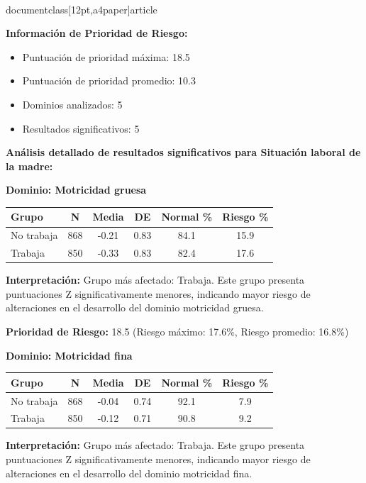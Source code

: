 \\documentclass[12pt,a4paper]{article}
\begin{document}
\textbf{Información de Prioridad de Riesgo:}
\begin{itemize}
\item Puntuación de prioridad máxima: 18.5
\item Puntuación de prioridad promedio: 10.3
\item Dominios analizados: 5
\item Resultados significativos: 5
\end{itemize}


\textbf{Análisis detallado de resultados significativos para Situación laboral de la madre:}


\textbf{Dominio: Motricidad gruesa}


\begin{center}
\begin{tabular}{|l|c|c|c|c|c|}
\hline
\textbf{Grupo} & \textbf{N} & \textbf{Media} & \textbf{DE} & \textbf{Normal \%} & \textbf{Riesgo \%} \\
\hline
No trabaja & 868 & -0.21 & 0.83 & 84.1 & 15.9 \\
Trabaja & 850 & -0.33 & 0.83 & 82.4 & 17.6 \\

\hline
\end{tabular}
\end{center}


\textbf{Interpretación:} Grupo más afectado: Trabaja. Este grupo presenta puntuaciones Z significativamente menores, indicando mayor riesgo de alteraciones en el desarrollo del dominio motricidad gruesa.

\textbf{Prioridad de Riesgo:} 18.5 (Riesgo máximo: 17.6\%, Riesgo promedio: 16.8\%)


\vspace{0.5cm}


\textbf{Dominio: Motricidad fina}


\begin{center}
\begin{tabular}{|l|c|c|c|c|c|}
\hline
\textbf{Grupo} & \textbf{N} & \textbf{Media} & \textbf{DE} & \textbf{Normal \%} & \textbf{Riesgo \%} \\
\hline
No trabaja & 868 & -0.04 & 0.74 & 92.1 & 7.9 \\
Trabaja & 850 & -0.12 & 0.71 & 90.8 & 9.2 \\

\hline
\end{tabular}
\end{center}


\textbf{Interpretación:} Grupo más afectado: Trabaja. Este grupo presenta puntuaciones Z significativamente menores, indicando mayor riesgo de alteraciones en el desarrollo del dominio motricidad fina.
\end{document}
